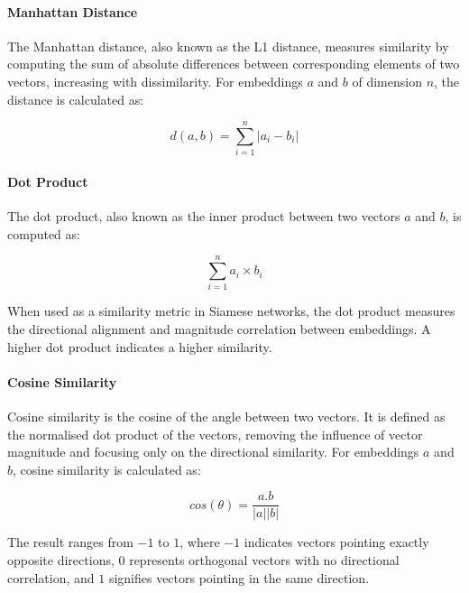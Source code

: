\paragraph{Manhattan Distance}
The Manhattan distance, also known as the L1 distance, measures similarity by computing the sum of absolute differences between corresponding elements of two vectors, increasing with dissimilarity. For embeddings $a$ and $b$ of dimension $n$, the distance is calculated as:

$$d(a, b) = \sum^n_{i=1}|a_i - b_i|$$


\paragraph{Dot Product} \label{METRIC:DotProduct}
The dot product, also known as the inner product between two vectors $a$ and $b$, is computed as:

$$\sum^n_{i=1}a_i \times b_i$$

When used as a similarity metric in Siamese networks, the dot product measures the directional alignment and magnitude correlation between embeddings. A higher dot product indicates a higher similarity. 

\paragraph{Cosine Similarity} \label{METRIC:CosineDistance}
Cosine similarity is the cosine of the angle between two vectors. It is defined as the normalised dot product of the vectors, removing the influence of vector magnitude and focusing only on the directional similarity. For embeddings $a$ and $b$, cosine similarity is calculated as:

$$cos(\theta) = \frac{a.b}{|a||b|}$$

The result ranges from $-1$ to $1$, where $-1$ indicates vectors pointing exactly opposite directions, $0$ represents orthogonal vectors with no directional correlation, and $1$ signifies vectors pointing in the same direction. 